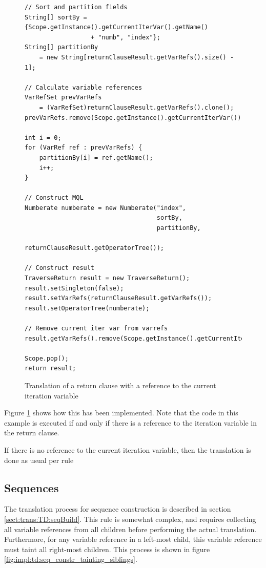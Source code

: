 \newpage
\begin{figure}[!htp]
\begin{center}
\lstset{language=Java,numbers=left}
\begin{lstlisting}
// Sort and partition fields
String[] sortBy = {Scope.getInstance().getCurrentIterVar().getName() 
		          + "numb", "index"};
String[] partitionBy 
	= new String[returnClauseResult.getVarRefs().size() - 1];

// Calculate variable references
VarRefSet prevVarRefs 
	= (VarRefSet)returnClauseResult.getVarRefs().clone();         
prevVarRefs.remove(Scope.getInstance().getCurrentIterVar());

int i = 0;
for (VarRef ref : prevVarRefs) {
    partitionBy[i] = ref.getName();
    i++;
}

// Construct MQL
Numberate numberate = new Numberate("index", 
                                    sortBy, 
                                    partitionBy, 
                                    returnClauseResult.getOperatorTree());

// Construct result
TraverseReturn result = new TraverseReturn();
result.setSingleton(false);
result.setVarRefs(returnClauseResult.getVarRefs());
result.setOperatorTree(numberate);

// Remove current iter var from varrefs
result.getVarRefs().remove(Scope.getInstance().getCurrentIterVar());

Scope.pop();
return result;
\end{lstlisting}
  \caption{Translation of a return clause with a reference to the current
  iteration variable}
  \label{fig:impl:td:for_return_withref}
\end{center}
\end{figure}

Figure \ref{fig:impl:td:for_return_withref} shows how this has been
implemented. Note that the code in this example is executed if and only if
there is a reference to the iteration variable in the return clause.

If there is no reference to the current iteration variable, then the
translation is done as usual per rule 

\subsection{Sequences}
\label{sect:impl:td:seq}
The translation process for sequence construction is described in section
\ref{sect:trans:TD:seqBuild}. This rule is somewhat complex, and requires
collecting all variable references from all children before performing the
actual translation. Furthermore, for any variable reference in a left-most
child, this variable reference must taint all right-most children. This process
is shown in figure \ref{fig:impl:td:seq_constr_tainting_siblings}.


